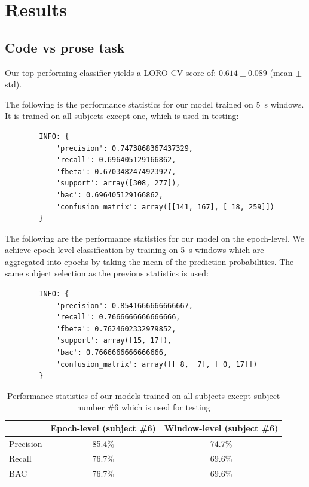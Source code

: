 \chapter{Results}


    \section{Code vs prose task}

        Our top-performing classifier yields a LORO-CV score of: $0.614 \pm 0.089$ (mean $\pm$ std).

        The following is the performance statistics for our model trained on \SI{5}{\second} windows. It is trained on all subjects except one, which is used in testing:

        \begin{verbatim}
        INFO: {
            'precision': 0.7473868367437329, 
            'recall': 0.696405129166862, 
            'fbeta': 0.6703482474923927, 
            'support': array([308, 277]), 
            'bac': 0.696405129166862, 
            'confusion_matrix': array([[141, 167], [ 18, 259]])
        }
        \end{verbatim}

        The following are the performance statistics for our model on the epoch-level. We achieve epoch-level classification by training on \SI{5}{\second} windows which are aggregated into epochs by taking the mean of the prediction probabilities. The same subject selection as the previous statistics is used:

        \begin{verbatim}
        INFO: {
            'precision': 0.8541666666666667, 
            'recall': 0.7666666666666666, 
            'fbeta': 0.7624602332979852, 
            'support': array([15, 17]), 
            'bac': 0.7666666666666666, 
            'confusion_matrix': array([[ 8,  7], [ 0, 17]])
        }
        \end{verbatim}

        \begin{table}
            \begin{center}
                \begin{tabular}{ l | c | c }
                  \toprule
                  & Epoch-level (subject \#6) & Window-level (subject \#6) \\ \midrule
                  Precision & 85.4\% & 74.7\% \\
                  Recall & 76.7\% & 69.6\% \\
                  BAC & 76.7\% & 69.6\% \\
                  \bottomrule
                  
                \end{tabular}
                \caption{Performance statistics of our models trained on all subjects except subject number \#6 which is used for testing}\label{fig:stats}
            \end{center}
        \end{table}

